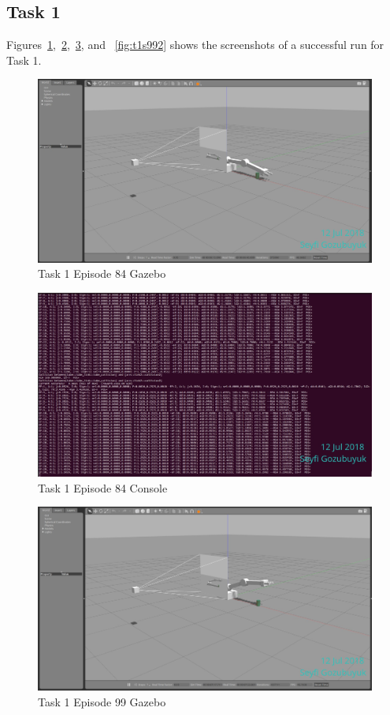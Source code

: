 \documentclass[10pt,journal,compsoc]{IEEEtran}
\begin{document}
\subsection{Task 1}
Figures~\ref{fig:t1s841},~\ref{fig:t1s842},~\ref{fig:t1s991}, and ~\ref{fig:t1s992} shows the screenshots of a successful run for Task 1.
\begin{figure}[thpb]
      \centering
      \includegraphics[width=\linewidth]{figures/Task1_Step84_1.png}
      \caption{Task 1 Episode 84 Gazebo}
      \label{fig:t1s841}
\end{figure}

\begin{figure}[thpb]
      \centering
      \includegraphics[width=\linewidth]{figures/Task1_Step84_2.png}
      \caption{Task 1 Episode 84 Console}
      \label{fig:t1s842}
\end{figure}

\begin{figure}[thpb]
      \centering
      \includegraphics[width=\linewidth]{figures/Task1_Step99_1.png}
      \caption{Task 1 Episode 99 Gazebo}
      \label{fig:t1s991}
\end{figure}
\end{document}
